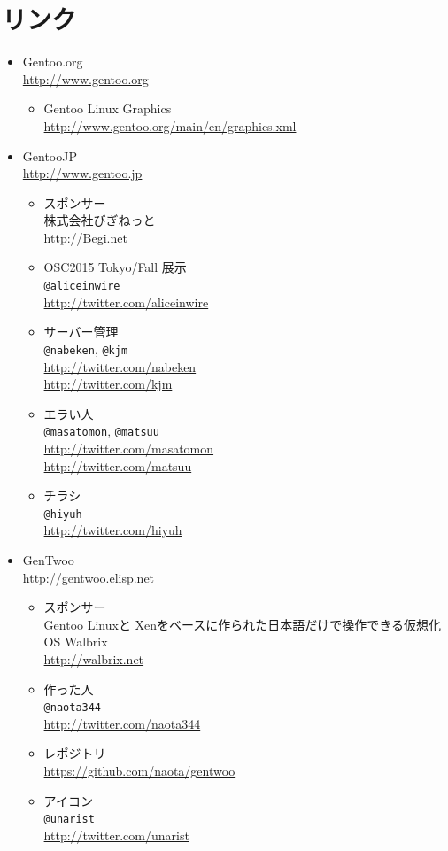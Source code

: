 \documentclass[10pt,foldmark,notumble]{leaflet}
\begin{document}
\section{リンク}
\begin{itemize}
	\item Gentoo.org \\
		\url{http://www.gentoo.org}
		\begin{itemize}
			\item Gentoo Linux Graphics \\
				\url{http://www.gentoo.org/main/en/graphics.xml}
		\end{itemize}
	\item GentooJP \\
		\url{http://www.gentoo.jp}
		\begin{itemize}
			\item スポンサー \\
				株式会社びぎねっと \\
				\url{http://Begi.net}
			\item OSC2015 Tokyo/Fall 展示 \\
				\verb|@aliceinwire| \\
				\url{http://twitter.com/aliceinwire}
			\item サーバー管理 \\
				\verb|@nabeken|, \verb|@kjm| \\
				\url{http://twitter.com/nabeken} \\
				\url{http://twitter.com/kjm}
			\item エラい人 \\
				\verb|@masatomon|, \verb|@matsuu| \\
				\url{http://twitter.com/masatomon} \\
				\url{http://twitter.com/matsuu}
			\item チラシ \\
				\verb|@hiyuh| \\
				\url{http://twitter.com/hiyuh}
		\end{itemize}
	\item GenTwoo \\
		\url{http://gentwoo.elisp.net}
		\begin{itemize}
			\item スポンサー \\
				Gentoo Linuxと Xenをベースに作られた日本語だけで操作できる仮想化OS Walbrix \\
				\url{http://walbrix.net}
			\item 作った人 \\
				\verb|@naota344| \\
				\url{http://twitter.com/naota344}
			\item レポジトリ \\
				\url{https://github.com/naota/gentwoo}
			\item アイコン \\
				\verb|@unarist| \\
				\url{http://twitter.com/unarist}
		\end{itemize}
\end{itemize}
\end{document}
